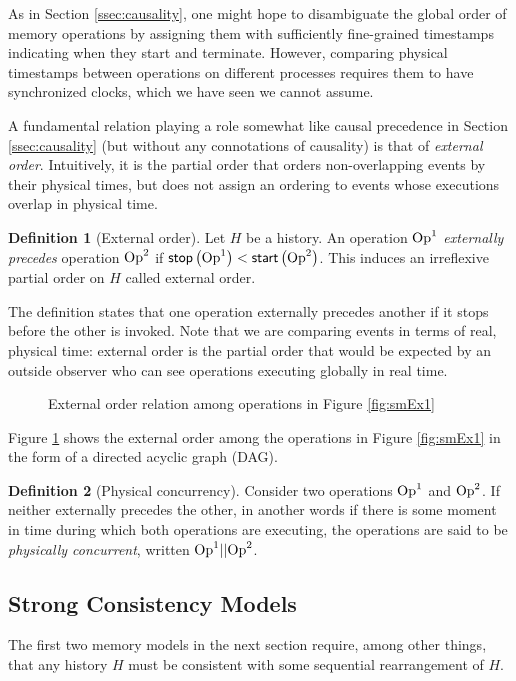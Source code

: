 \documentclass[]             %
{NASA}                       %
\theoremstyle{definition}
\newtheorem{definition}{Definition}[section]
\begin{document}
As in Section \ref{ssec:causality}, one might hope to disambiguate the
global order of memory operations by assigning them with sufficiently
fine-grained timestamps indicating when they start and
terminate. However, comparing physical timestamps between operations
on different processes requires them to have synchronized clocks,
which we have seen we cannot assume.

A fundamental relation playing a role somewhat like causal precedence
in Section \ref{ssec:causality} (but without any connotations of
causality) is that of \emph{external order}. Intuitively, it is the
partial order that orders non-overlapping events by their physical
times, but does not assign an ordering to events whose executions
overlap in physical time.

\begin{definition}[External order]
  Let $H$ be a history. An operation $\mathrm{Op}^1$ \emph{externally
    precedes} operation $\mathrm{Op}^2$ if
  $\mathsf{stop}\left(\mathrm{Op}^1\right) < \mathsf{start}\left(\mathrm{Op}^2\right)$. This induces an irreflexive
  partial order on $H$ called external order.
\end{definition}
The definition states that one operation externally precedes another
if it stops before the other is invoked. Note that we are comparing
events in terms of real, physical time: external order is the partial
order that would be expected by an outside observer who can see
operations executing globally in real time.

\begin{figure}
  \centering
  
  \caption{External order relation among operations in Figure \ref{fig:smEx1}}
  \label{fig:smEx1DAG}
\end{figure}

Figure \ref{fig:smEx1DAG} shows the external order among the
operations in Figure \ref{fig:smEx1} in the form of a directed
acyclic graph (DAG).


\begin{definition}[Physical concurrency]
  Consider two operations $\mathrm{Op}^1$ and $\mathrm{Op}^2$. If neither externally
  precedes the other, in another words if there is some moment in time
  during which both operations are executing, the operations are said
  to be \emph{physically concurrent}, written $\mathrm{Op}^1 || \mathrm{Op}^2$.
\end{definition}

\subsection{Strong Consistency Models}
\label{ssec:strong-consistency}
The first two memory models in the next section require, among other
things, that any history $H$ must be consistent with some sequential
rearrangement of $H$.
\end{document}
